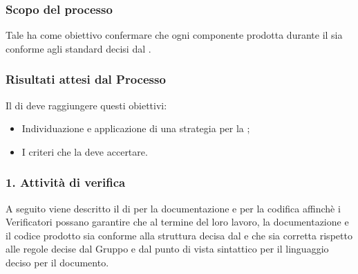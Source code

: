 \subsubsection{Scopo del processo}
Tale  ha come obiettivo confermare che ogni componente prodotta durante il  sia conforme agli standard decisi dal .
\subsubsection{Risultati attesi dal Processo}
Il  di  deve raggiungere questi obiettivi:
\begin{itemize}
\item Individuazione e applicazione di una strategia per la ;
\item I criteri che la  deve accertare.
\end{itemize}

\subsubsection{1. Attivit\`a di verifica}
A seguito viene descritto il  di  per la documentazione e per la codifica affinchè i Verificatori possano garantire che al termine del loro lavoro, la documentazione e il codice prodotto sia conforme alla struttura decisa dal  e che sia corretta rispetto alle regole decise dal Gruppo e dal punto di vista sintattico per il linguaggio deciso per il documento.

